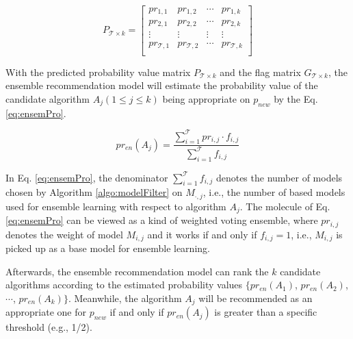 \documentclass[prodmode,acmtkdd]{acmsmall}
\begin{document}
\begin{equation}
    P_{\mathcal{T}\times k} =\left[
  \begin{array}{cccc}
    pr_{1,1} & pr_{1,2} & \cdots & pr_{1,k} \\
    pr_{2,1} & pr_{2,2} & \cdots & pr_{2,k} \\
    \vdots & \vdots &  \vdots & \vdots \\
    pr_{\mathcal{T},1} & pr_{\mathcal{T},2} & \cdots & pr_{\mathcal{T},k} \\
  \end{array}
    \right]
\end{equation}

With the predicted probability value matrix $P_{\mathcal{T}\times k}$ and the
flag matrix $G_{\mathcal{T}\times k}$, the ensemble recommendation model will
estimate the probability value of the candidate algorithm $A_j
(1\leq j\leq k)$ being appropriate on $p_{new}$ by the Eq.
\ref{eq:ensemPro}.

\begin{equation}\label{eq:ensemPro}
    pr_{en}(A_j) = \frac{\sum\limits_{i=1}^{\mathcal{T}}pr_{i,j}\cdot f_{i,j}}{\sum\limits_{i=1}^{\mathcal{T}}f_{i,j}}
\end{equation}

In Eq. \ref{eq:ensemPro}, the denominator
$\sum\limits_{i=1}^{\mathcal{T}}f_{i,j}$ denotes the number of models chosen
by Algorithm \ref{algo:modelFilter} on $M_{\cdot,j}$, i.e., the
number of based models used for ensemble learning with respect to
algorithm $A_j$. The molecule of Eq. \ref{eq:ensemPro} can be viewed
as a kind of weighted voting ensemble, where $pr_{i,j}$ denotes the
weight of model $M_{i,j}$ and it works if and only if $f_{i,j} = 1$,
i.e., $M_{i,j}$ is picked up as a base model for ensemble learning.

Afterwards, the ensemble recommendation model can rank the $k$
candidate algorithms according to the estimated probability values
$\{pr_{en}(A_1)$, $pr_{en}(A_2)$, $\cdots$, $pr_{en}(A_k)\}$.
Meanwhile, the algorithm $A_j$ will be recommended as an appropriate
one for $p_{new}$ if and only if $pr_{en}(A_j)$ is greater than a
specific threshold (e.g., 1/2).
\end{document}
